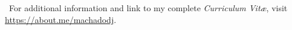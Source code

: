 \documentclass[11pt, a4, sans]{moderncv}
\begin{document}


\vfill

{\color{MyLightBlue}~For additional information and link to my complete \emph{Curriculum Vit\ae}, visit \href{https://about.me/machadodj}{https://about.me/machadodj}.}
\end{document}
